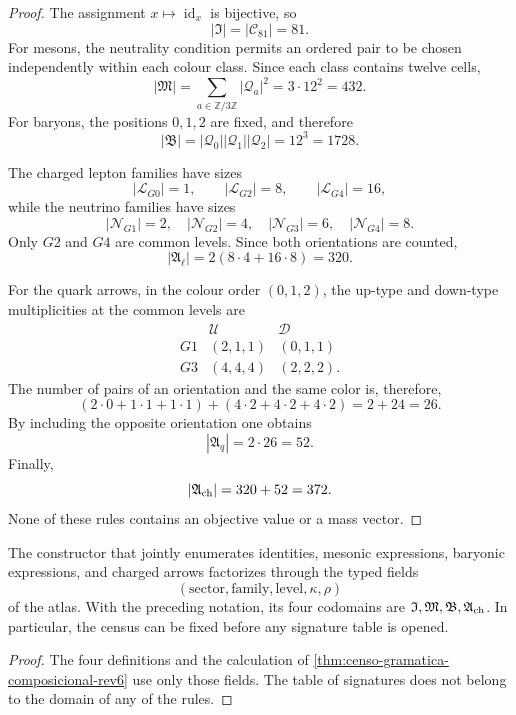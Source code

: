\begin{proof}
The assignment \(x\mapsto\operatorname{id}_x\) is bijective, so
\[
 |\mathfrak I|=|\mathcal C_{81}|=81.
\]
For mesons, the neutrality condition permits an ordered pair to be chosen
independently within each colour class. Since each
class contains twelve cells,
\[
 |\mathfrak M|
 =\sum_{a\in\mathbb Z/3\mathbb Z}|\mathcal Q_a|^2
 =3\cdot12^2
 =432.
\]
For baryons, the positions \(0,1,2\) are fixed, and therefore
\[
 |\mathfrak B|
 =|\mathcal Q_0||\mathcal Q_1||\mathcal Q_2|
 =12^3
 =1728.
\]

The charged lepton families have sizes
\[
 |\mathcal L_{G0}|=1,\qquad
 |\mathcal L_{G2}|=8,\qquad
 |\mathcal L_{G4}|=16,
\]
while the neutrino families have sizes
\[
 |\mathcal N_{G1}|=2,\quad
 |\mathcal N_{G2}|=4,\quad
 |\mathcal N_{G3}|=6,\quad
 |\mathcal N_{G4}|=8.
\]
Only \(G2\) and \(G4\) are common levels. Since both
orientations are counted,
\[
 |\mathfrak A_\ell|
 =2(8\cdot4+16\cdot8)
 =320.
\]

For the quark arrows, in the colour order \((0,1,2)\), the
up-type and down-type multiplicities at the common levels are
\[
\begin{array}{ccc}
 &\mathcal U&\mathcal D\\
 G1&(2,1,1)&(0,1,1)\\
 G3&(4,4,4)&(2,2,2).
\end{array}
\]
The number of pairs of an orientation and the same color is, therefore,
\[
 (2\cdot0+1\cdot1+1\cdot1)
 +(4\cdot2+4\cdot2+4\cdot2)
 =2+24=26.
\]
By including the opposite orientation one obtains
\[
 |\mathfrak A_q|=2\cdot26=52.
\]
Finally,
\[
 |\mathfrak A_{\rm ch}|=320+52=372.
\]
None of these rules contains an objective value or a mass vector.
\end{proof}

\begin{corollary}
\label{cor:constructor-composicional-sin-blancos}
The constructor that jointly enumerates identities, mesonic expressions,
baryonic expressions, and charged arrows factorizes through the typed fields
\[
 (\text{sector},\text{family},\text{level},\kappa,\rho)
\]
of the atlas. With the preceding notation, its four codomains are
\(\mathfrak I,\mathfrak M,\mathfrak B,\mathfrak A_{\rm ch}\).
In particular, the census can be fixed before any signature table is opened.
\end{corollary}

\begin{proof}
The four definitions and the calculation of
\cref{thm:censo-gramatica-composicional-rev6} use only those fields.
The table of signatures does not belong to the domain of any of the rules.
\end{proof}

